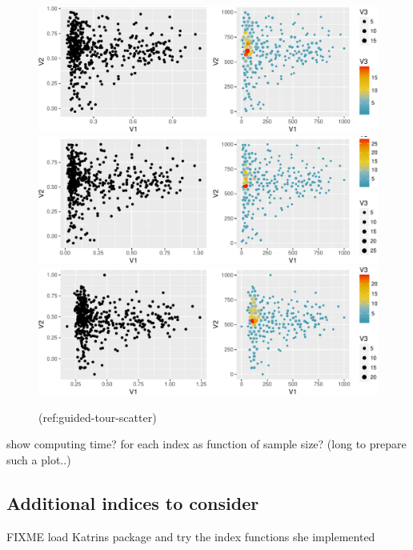 \documentclass[article]{jss}
\begin{document}
\begin{CodeChunk}
\begin{figure}

{\centering \includegraphics[width=\textwidth]{figure/guided-tour-scatter-1} \includegraphics[width=\textwidth]{figure/guided-tour-scatter-2} \includegraphics[width=\textwidth]{figure/guided-tour-scatter-3} 

}

\caption[(ref:guided-tour-scatter)]{(ref:guided-tour-scatter)}\label{fig:guided-tour-scatter}
\end{figure}
\end{CodeChunk}

show computing time? for each index as function of sample size? (long to
prepare such a plot..)

\subsection{Additional indices to
consider}\label{additional-indices-to-consider}

FIXME load Katrins package and try the index functions she implemented
\end{document}
